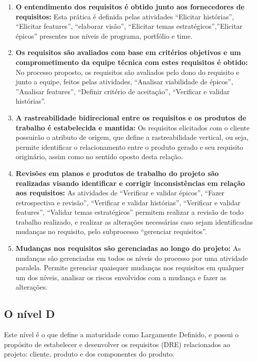 \begin{enumerate}
    \item \textbf{O entendimento dos requisitos é obtido junto aos fornecedores de requisitos:} Esta prática é definida pelas atividades “Elicitar histórias”, “Elicitar features”, “elaborar visão”, “Elicitar temas estratégicos”,”Elicitar épicos” presentes nos níveis de programa, portfólio e time.
    \item \textbf{Os requisitos são avaliados com base em critérios objetivos e um comprometimento da equipe técnica com estes requisitos é obtido:} No processo proposto, os requisitos são avaliados pelo dono do requisito e junto a equipe, feitos pelas atividades, “Analisar viabilidade de épicos”, ”Analisar features”, “Definir critério de aceitação”, “Verificar e validar histórias”.
    \item \textbf{A rastreabilidade bidirecional entre os requisitos e os produtos de trabalho é estabelecida e mantida:} Os requisitos elicitados com o cliente possuirão o atributo de origem, que define a rastreabilidade vertical, ou seja, permite identificar o relacionamento entre o produto gerado e seu requisito originário, assim como no sentido oposto desta relação.
    \item \textbf{Revisões em planos e produtos de trabalho do projeto são realizadas visando identificar e corrigir inconsistências em relação aos requisitos:} As atividades de “Verificar e validar épicos”, “Fazer retrospectiva e revisão”, “Verificar e validar histórias”, “Verificar e validar features”, “Validar temas estratégicos” permitem realizar a revisão de todo trabalho realizado, e realizar as alterações necessárias caso sejam identificadas mudanças no requisito, pelo subprocesso “gerenciar requisitos”.
    \item \textbf{Mudanças nos requisitos são gerenciadas ao longo do projeto:} As mudanças são gerenciadas em todos os níveis do processo por uma atividade paralela. Permite gerenciar quaisquer mudanças nos requisitos em qualquer um dos níveis, analisar os riscos envolvidos com a mudança e fazer as alterações.
\end{enumerate}

\subsection{O nível D}

Este nível é o que define a maturidade como Largamente Definido, e possui o propósito de estabelecer e desenvolver os requisitos (DRE) relacionados ao projeto: cliente, produto e dos componentes do produto.

